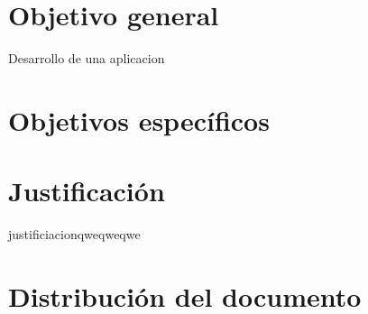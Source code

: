 
\section{Objetivo general}

Desarrollo de una aplicacion

\section{Objetivos específicos}

\section{Justificación}
justificiacionqweqweqwe
\section{Distribución del documento}

